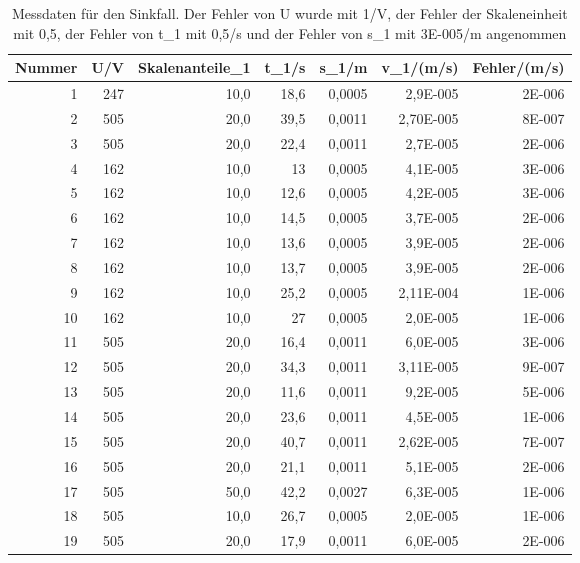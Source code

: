 \documentclass[12pt]{scrartcl}
\begin{document}
\begin{table}[H]
\caption{Messdaten für den Sinkfall. Der Fehler von U wurde mit 1/V, der Fehler der Skaleneinheit mit 0,5, der Fehler von t\_1 mit 0,5/s und der Fehler von s\_1 mit 3E-005/m angenommen}
\begin{center}
\begin{tabular}{|r|r|r|r|r|r|r|}
\hline
\multicolumn{1}{|l|}{Nummer} & \multicolumn{1}{|l|}{U/V} & \multicolumn{1}{l|}{Skalenanteile\_1} & \multicolumn{1}{l|}{t\_1/s} & \multicolumn{1}{l|}{s\_1/m} & \multicolumn{1}{l|}{v\_1/(m/s)} & \multicolumn{1}{l|}{Fehler/(m/s)} \\ \hline
1 & 247 & 10,0 & 18,6 & 0,0005 & 2,9E-005 & 2E-006 \\ \hline
2 & 505 & 20,0 & 39,5 & 0,0011  & 2,70E-005 & 8E-007 \\ \hline
3 & 505 & 20,0 & 22,4 & 0,0011 & 2,7E-005  & 2E-006 \\ \hline
4 & 162 & 10,0 & 13 & 0,0005  & 4,1E-005 & 3E-006 \\ \hline
5 & 162 & 10,0 & 12,6 & 0,0005  & 4,2E-005 & 3E-006 \\ \hline
6 & 162 & 10,0 & 14,5 & 0,0005  & 3,7E-005 & 2E-006 \\ \hline
7 & 162 & 10,0 & 13,6 & 0,0005  & 3,9E-005 & 2E-006 \\ \hline
8 & 162 & 10,0 & 13,7 & 0,0005  & 3,9E-005 & 2E-006 \\ \hline
9 & 162 & 10,0 & 25,2 & 0,0005  & 2,11E-004 & 1E-006 \\ \hline
10 & 162 & 10,0 & 27 & 0,0005  & 2,0E-005 & 1E-006 \\ \hline
11 & 505 & 20,0 & 16,4 & 0,0011  & 6,0E-005 & 3E-006 \\ \hline
12 & 505 & 20,0 & 34,3 & 0,0011  & 3,11E-005 & 9E-007 \\ \hline
13 & 505 & 20,0 & 11,6 & 0,0011  & 9,2E-005 & 5E-006 \\ \hline
14 & 505 & 20,0 & 23,6 & 0,0011  & 4,5E-005 & 1E-006 \\ \hline
15 & 505 & 20,0 & 40,7 & 0,0011  & 2,62E-005 & 7E-007 \\ \hline
16 & 505 & 20,0 & 21,1 & 0,0011  & 5,1E-005 & 2E-006 \\ \hline
17 & 505 & 50,0 & 42,2 & 0,0027  & 6,3E-005 & 1E-006 \\ \hline
18 & 505 & 10,0 & 26,7 & 0,0005  & 2,0E-005 & 1E-006 \\ \hline
19 & 505 & 20,0 & 17,9 & 0,0011  & 6,0E-005 & 2E-006 \\ \hline

\end{tabular}
\end{center}
\end{table}
\end{document}
